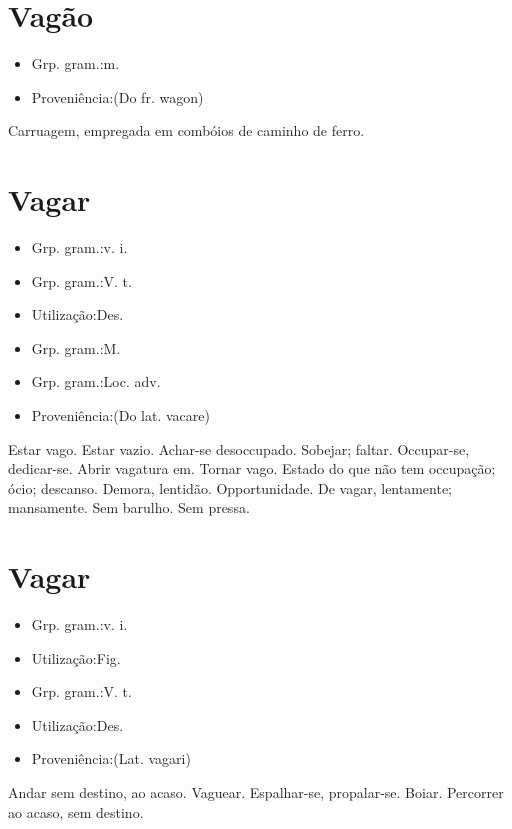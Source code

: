 \documentclass{article}
\begin{document}
\section{Vagão}
\begin{itemize}
\item {Grp. gram.:m.}
\end{itemize}
\begin{itemize}
\item {Proveniência:(Do fr. \textunderscore wagon\textunderscore )}
\end{itemize}
Carruagem, empregada em combóios de caminho de ferro.
\section{Vagar}
\begin{itemize}
\item {Grp. gram.:v. i.}
\end{itemize}
\begin{itemize}
\item {Grp. gram.:V. t.}
\end{itemize}
\begin{itemize}
\item {Utilização:Des.}
\end{itemize}
\begin{itemize}
\item {Grp. gram.:M.}
\end{itemize}
\begin{itemize}
\item {Grp. gram.:Loc. adv.}
\end{itemize}
\begin{itemize}
\item {Proveniência:(Do lat. \textunderscore vacare\textunderscore )}
\end{itemize}
Estar vago.
Estar vazio.
Achar-se desoccupado.
Sobejar; faltar.
Occupar-se, dedicar-se.
Abrir vagatura em.
Tornar vago.
Estado do que não tem occupação; ócio; descanso.
Demora, lentidão.
Opportunidade.
\textunderscore De vagar\textunderscore , lentamente; mansamente.
Sem barulho.
Sem pressa.
\section{Vagar}
\begin{itemize}
\item {Grp. gram.:v. i.}
\end{itemize}
\begin{itemize}
\item {Utilização:Fig.}
\end{itemize}
\begin{itemize}
\item {Grp. gram.:V. t.}
\end{itemize}
\begin{itemize}
\item {Utilização:Des.}
\end{itemize}
\begin{itemize}
\item {Proveniência:(Lat. \textunderscore vagari\textunderscore )}
\end{itemize}
Andar sem destino, ao acaso.
Vaguear.
Espalhar-se, propalar-se.
Boiar.
Percorrer ao acaso, sem destino.
\end{document}
